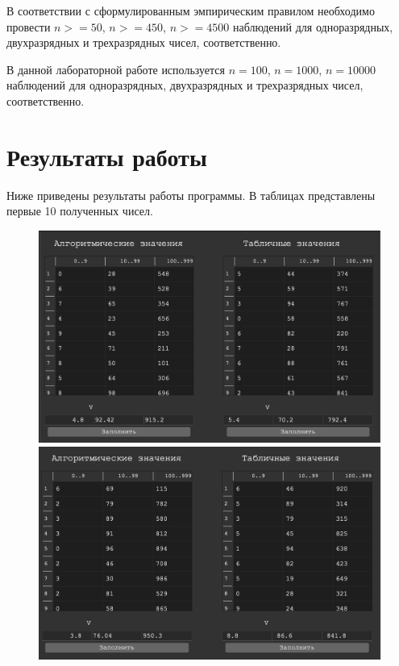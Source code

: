 \documentclass[a4paper,12pt]{article}
\begin{document}
	В соответствии с сформулированным эмпирическим правилом необходимо провести $n >= 50$, $n >= 450$, $n >= 4500$ наблюдений для одноразрядных, двухразрядных и трехразрядных чисел, соответственно.
	
	В данной лабораторной работе используется $n = 100$, $n = 1000$, $n = 10000$ наблюдений для одноразрядных, двухразрядных и трехразрядных чисел, соответственно.
	
	\newpage
	
	\section*{Результаты работы}
	
	Ниже приведены результаты работы программы. В таблицах представлены первые 10 полученных чисел.
	
	\begin{figure}[h!]
		\begin{minipage}[b]{0.5\textwidth}
			\includegraphics[width=\textwidth]{examples/1.png}
		\end{minipage}
		\begin{minipage}[b]{0.5\textwidth}
			\includegraphics[width=\textwidth]{examples/2.png}
		\end{minipage}
		\label{ris:examples_1_2}
	\end{figure}
\end{document}
